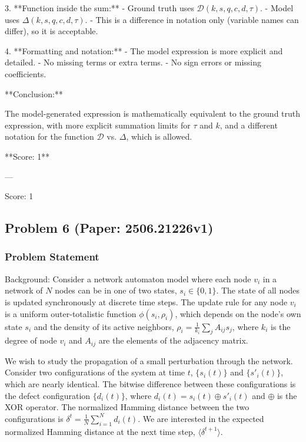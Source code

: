 \documentclass[10pt]{article}
\begin{document}
3. **Function inside the sum:**
   - Ground truth uses \(\mathcal{D}(k,s,q,c,d,\tau)\).
   - Model uses \(\Delta(k,s,q,c,d,\tau)\).
   - This is a difference in notation only (variable names can differ), so it is acceptable.

4. **Formatting and notation:**
   - The model expression is more explicit and detailed.
   - No missing terms or extra terms.
   - No sign errors or missing coefficients.

**Conclusion:**

The model-generated expression is mathematically equivalent to the ground truth expression, with more explicit summation limits for \(\tau\) and \(k\), and a different notation for the function \(\mathcal{D}\) vs. \(\Delta\), which is allowed.

**Score: 1**

---

Score: 1

\newpage
\subsection*{Problem 6 (Paper: 2506.21226v1)}
\subsubsection*{Problem Statement}
Background:
Consider a network automaton model where each node $v_i$ in a network of $N$ nodes can be in one of two states, $s_i \in \{0,1\}$. The state of all nodes is updated synchronously at discrete time steps. The update rule for any node $v_i$ is a uniform outer-totalistic function $\phi(s_i, \rho_i)$, which depends on the node's own state $s_i$ and the density of its active neighbors, $\rho_i = \frac{1}{k_i}\sum_{j}A_{ij}s_j$, where $k_i$ is the degree of node $v_i$ and $A_{ij}$ are the elements of the adjacency matrix.

We wish to study the propagation of a small perturbation through the network. Consider two configurations of the system at time $t$, $\{s_i(t)\}$ and $\{s'_i(t)\}$, which are nearly identical. The bitwise difference between these configurations is the defect configuration $\{d_i(t)\}$, where $d_i(t) = s_i(t) \oplus s'_i(t)$ and $\oplus$ is the XOR operator. The normalized Hamming distance between the two configurations is $\delta^t = \frac{1}{N}\sum_{i=1}^N d_i(t)$. We are interested in the expected normalized Hamming distance at the next time step, $\langle\delta^{t+1}\rangle$.
\end{document}
